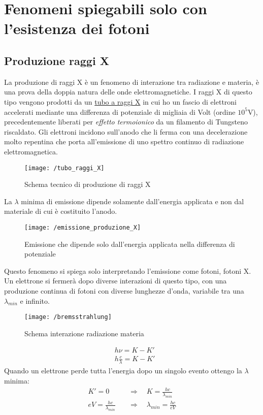 \section{Fenomeni spiegabili solo con l'esistenza dei fotoni}

\subsection{Produzione raggi X}

La produzione di raggi X è un fenomeno di interazione tra radiazione e materia, è una prova della doppia natura delle onde elettromagnetiche.
I raggi X di questo tipo vengono prodotti da un \underline{tubo a raggi X} in cui ho un fascio di elettroni accelerati mediante una differenza di potenziale di migliaia di Volt (ordine $10^5$V), precedentemente liberati per \textit{effetto termoionico} da un filamento di Tungsteno riscaldato.
Gli elettroni incidono sull'anodo che li ferma con una decelerazione molto repentina che porta all'emissione di uno spettro continuo di radiazione elettromagnetica.

\begin{figure}[h]
\centering
\texttt{[image: /tubo\_raggi\_X]}
\caption{Schema tecnico di produzione di raggi X}
\end{figure}

La $\lambda$ minima di emissione dipende solamente dall'energia applicata e non dal materiale di cui è costituito l'anodo.
\begin{figure}[h]
\centering
\texttt{[image: /emissione\_produzione\_X]}
\caption{Emissione che dipende solo dall'energia applicata nella differenza di potenziale}
\end{figure}

Questo fenomeno si spiega solo interpretando l'emissione come fotoni, fotoni X.
Un elettrone si fermerà dopo diverse interazioni di questo tipo, con una produzione continua di fotoni con diverse lunghezze d'onda,
variabile tra una $\lambda_{min}$ e infinito.
\begin{figure}[h]
\centering
\texttt{[image: /bremsstrahlung]}
\caption{Schema interazione radiazione materia}
\end{figure}

\begin{equation}
\begin{split}
& h\nu = K - K' \\
& h \frac{ c}{\lambda } = K - K'
\end{split}
\end{equation}
Quando un elettrone perde tutta l'energia dopo un singolo evento ottengo la $\lambda$ minima:
\begin{equation}
\begin{split}
K' = 0 \quad & \Rightarrow \quad K = \frac{ hc}{\lambda_{min} } \\
eV = \frac{ hc}{\lambda_{min} } \quad & \Rightarrow \quad \lambda_{min} = \frac{ hc}{eV }
\end{split}
\end{equation}

